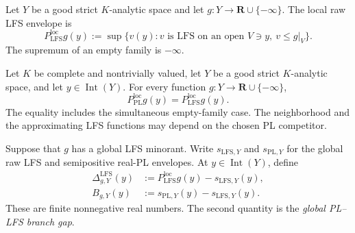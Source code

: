 
\begin{definition}
\label{def:p031-local-lfs-envelope}
Let $Y$ be a good strict $K$-analytic space and let
$g:Y\to\mathbf R\cup\{-\infty\}$.  The local raw LFS envelope is
\begin{equation}
\label{eq:p031-local-lfs-envelope}
 P_{\mathrm{LFS}}^{\mathrm{loc}}g(y)
  :=\sup\{v(y):v\text{ is LFS on an open }V\ni y,
                    \ v\leq g|_V\}.
\end{equation}
The supremum of an empty family is $-\infty$.
\end{definition}

\begin{theorem}
\label{thm:p031-local-pl-lfs-cofinality}
Let $K$ be complete and nontrivially valued, let $Y$ be a good strict
$K$-analytic space, and let $y\in\operatorname{Int}(Y)$.  For every
function $g:Y\to\mathbf R\cup\{-\infty\}$,
\begin{equation}
\label{eq:p031-local-pl-lfs-cofinality}
             P_{\mathrm{PL}}^{\mathrm{loc}}g(y)
                =P_{\mathrm{LFS}}^{\mathrm{loc}}g(y).
\end{equation}
The equality includes the simultaneous empty-family case.  The
neighborhood and the approximating LFS functions may depend on the chosen
PL competitor.
\end{theorem}

\begin{definition}
\label{def:p031-lfs-globalization-defect}
Suppose that $g$ has a global LFS minorant.  Write $s_{\mathrm{LFS},Y}$
and $s_{\mathrm{PL},Y}$ for the global raw LFS and semipositive real-PL
envelopes.  At $y\in\operatorname{Int}(Y)$, define
\begin{align}
 \Delta^{\mathrm{LFS}}_{g,Y}(y)
   &:=P_{\mathrm{LFS}}^{\mathrm{loc}}g(y)
        -s_{\mathrm{LFS},Y}(y),
\label{eq:p031-lfs-globalization-defect}\\
 B_{g,Y}(y)
   &:=s_{\mathrm{PL},Y}(y)-s_{\mathrm{LFS},Y}(y).
\label{eq:p031-pl-lfs-branch-gap}
\end{align}
These are finite nonnegative real numbers.  The second quantity is the
\emph{global PL--LFS branch gap}.
\end{definition}

